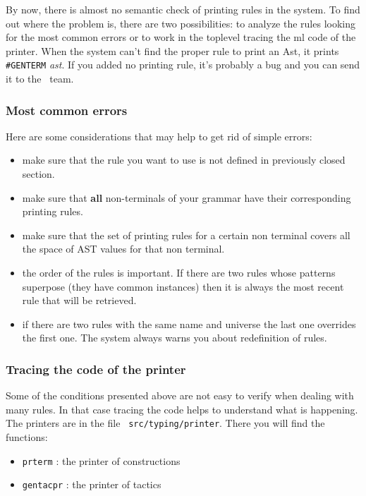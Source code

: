   By now, there is almost no semantic check of printing rules in the
  system.  To find out where the problem is, there are two
  possibilities: to analyze the rules looking for the most common
  errors or to work in the toplevel tracing the ml code of the
  printer.
When the system can't find the proper rule to print an Ast, it prints
\verb+#GENTERM+ \textit{ast}. If you added no printing rule,
  it's probably a bug and you can send it to the \Coq\ team.

\subsubsection{Most common errors}
Here are some considerations that may help to get rid of simple
errors:

\begin{itemize}
\item make sure that the rule you want to use is not defined in
  previously closed section.
\item make sure that {\bf all} non-terminals of your grammar have
  their corresponding printing rules.

\item make sure that the set of printing rules for a certain non
  terminal covers all the space of AST values for that non terminal.

\item the order of the rules is important. If there are two rules
  whose patterns superpose (they have common instances) then it is
  always the most recent rule that will be retrieved.
\item if there are two rules with the same name and universe the last
  one overrides the first one. The system always warns you about
  redefinition of rules.
\end{itemize}

\subsubsection{Tracing the {\ocaml} code of the printer}
Some of the conditions presented above are not easy to verify when
dealing with many rules. In that case tracing the code helps to
understand what is happening. The printers are in the file {\tt
src/typing/printer}. There you will find the functions:

\begin{itemize}
\item {\tt prterm} : the printer of constructions
\item {\tt gentacpr} : the printer of tactics
\end{itemize}

